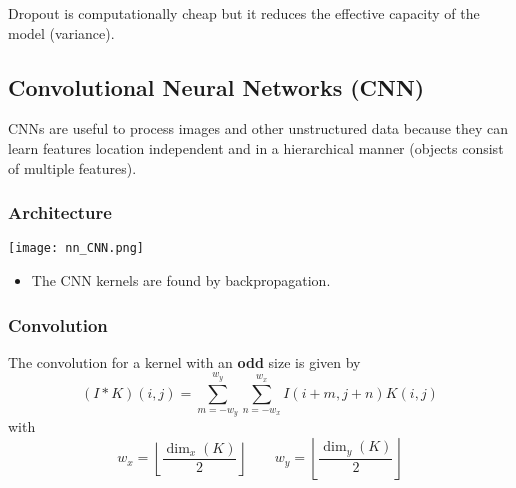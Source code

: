 
\newpar{}
Dropout is computationally cheap but it reduces the effective capacity of the model (variance).

\subsection{Convolutional Neural Networks (CNN)}

CNNs are useful to process images and other unstructured data because they can learn features location independent and in a hierarchical manner (objects consist of multiple features).
\newpar{}

\subsubsection{Architecture}
\begin{center}
    \texttt{[image: nn\_CNN.png]}
\end{center}
\newpar{}
\begin{itemize}
    \item The CNN kernels are found by backpropagation.
\end{itemize}


\subsubsection{Convolution}
The convolution for a kernel with an \textbf{odd} size is given by
\begin{equation*}
    (I * K)(i,j) = \sum_{m=-w_y}^{w_y}\sum_{n=-w_x}^{w_x}I(i+m,j+n)K(i,j)
\end{equation*}
with
\begin{equation*}
    w_x = \left\lfloor \frac{\dim_x(K)}{2} \right\rfloor \qquad
    w_y = \left\lfloor \frac{\dim_y(K)}{2} \right\rfloor
\end{equation*}

